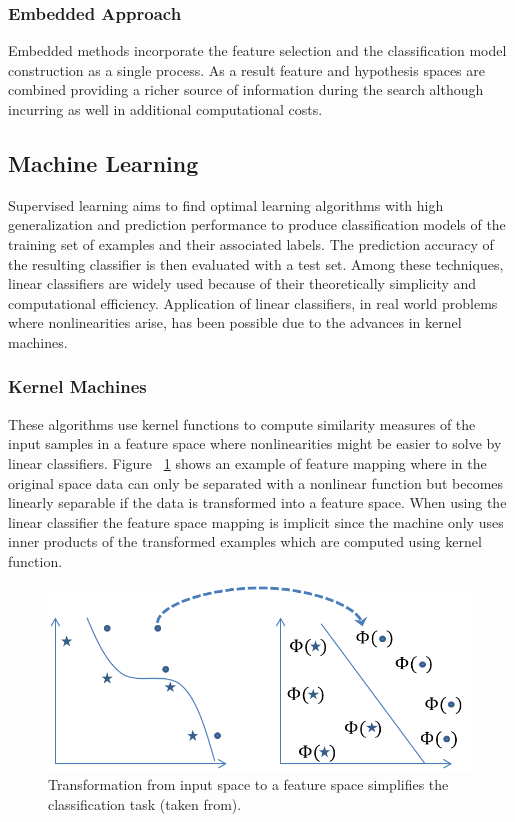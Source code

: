 \subsubsection{Embedded Approach}
Embedded methods incorporate the feature selection and the classification model construction as a single process.  As a result feature and hypothesis spaces are combined providing a richer source of information during the search although incurring as well in additional computational costs.  
\subsection{Machine Learning}
Supervised learning aims to find optimal learning algorithms with high generalization and prediction performance to produce classification models of the training set of examples and their associated labels.  The prediction accuracy of the resulting classifier is then evaluated with a test set.  Among these techniques, linear classifiers are widely used because of their theoretically simplicity and computational efficiency.  Application of linear classifiers, in real world problems where nonlinearities arise, has been possible due to the advances in kernel machines\cite{cristianini04}.
\subsubsection{Kernel Machines}
\label{subsub:kern}
These algorithms use kernel functions to compute similarity measures of the input samples in a feature space where nonlinearities might be easier to solve by linear classifiers.  Figure ~\ref{fig:im10} shows an example of feature mapping where in the original space data can only be separated with a nonlinear function but becomes linearly separable if the data is transformed into a feature space.  When using the linear classifier the feature space mapping is implicit since the machine only uses inner products of the transformed examples which are computed using kernel function.   

\begin{figure}[ht]
	\centering
		\includegraphics[scale=1.2]{Images/kernel.png}
	\caption[Transformation from input space to a feature space simplifies the classification task.]%
	{Transformation from input space to a feature space simplifies the classification task (taken from\cite{cristianini04}).}
	\label{fig:im10}
\end{figure}

